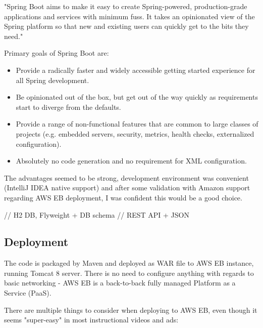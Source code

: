 "Spring Boot aims to make it easy to create Spring-powered, production-grade applications and services with minimum fuss. It takes an opinionated view of the Spring platform so that new and existing users can quickly get to the bits they need."\cite{spring-boot-blog}

Primary goals of Spring Boot are\cite{spring-boot-doc}:

\begin{itemize}
	\item Provide a radically faster and widely accessible getting started experience for all Spring development.
	\item Be opinionated out of the box, but get out of the way quickly as requirements start to diverge from the defaults.
	\item Provide a range of non-functional features that are common to large classes of projects (e.g. embedded servers, security, metrics, health checks, externalized configuration).
	\item Absolutely no code generation and no requirement for XML configuration.
\end{itemize}

The advantages seemed to be strong, development environment was convenient (IntelliJ IDEA native support) and after some validation with Amazon support regarding AWS EB deployment, I was confident this would be a good choice.

// H2 DB, Flyweight + DB schema
// REST API + JSON

\subsection{Deployment}

The code is packaged by Maven and deployed as WAR file to AWS EB instance, running Tomcat 8 server. There is no need to configure anything with regards to basic networking - AWS EB is a back-to-back fully managed Platform as a Service (PaaS).

There are multiple things to consider when deploying to AWS EB, even though it seems "super-easy" in most instructional videos and ads:

